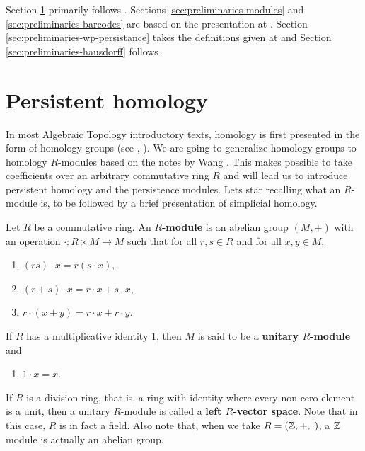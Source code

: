 Section \ref{sec:preliminaries-homology} primarily follows \cite{wang}. Sections \ref{sec:preliminaries-modules} and \ref{sec:preliminaries-barcodes} are based on the presentation at \cite{polterovich}. Section \ref{sec:preliminaries-wp-persistance} takes the definitions given at \cite{bubenik2} and Section \ref{sec:preliminaries-hausdorff} follows \cite{burago}.

\section{Persistent homology} \label{sec:preliminaries-homology}

In most Algebraic Topology introductory texts, homology is first presented in the form of homology groups (see \cite{munkres}, \cite{hatcher}). We are going to generalize homology groups to homology $R$-modules based on the notes by Wang \cite{wang}. This makes possible to take coefficients over an arbitrary commutative ring $ R $ and will lead us to introduce persistent homology and the persistence modules. Lets star recalling what an $R$-module is, to be followed by a brief presentation of simplicial homology.

\begin{definition}
    Let $ R $ be a commutative ring. An {\bf $R$-module } is an abelian group $ (M, +) $ with an operation $ \cdot \colon R \times M \to M $ such that for all $ r, s \in R $ and for all $ x, y \in M $,
    \begin{enumerate}
    \renewcommand{\labelenumi}{(\roman{enumi})}
        \item $ (rs) \cdot x = r (s \cdot x) $,
        \item $ (r + s) \cdot x = r \cdot x + s \cdot x $,
        \item $ r \cdot (x + y) = r \cdot x + r \cdot y $.
    \end{enumerate}
    If $ R $ has a multiplicative identity $ 1 $, then $ M $ is said to be a {\bf unitary $R$-module} and 
    \begin{enumerate}
    \renewcommand{\labelenumi}{(\roman{enumi})}
        \setcounter{enumi}{3}
        \item $1 \cdot x = x $.
    \end{enumerate}
    If $ R $ is a division ring, that is, a ring with identity where every non cero element is a unit, then 
    a unitary $R$-module is called a {\bf left $R$-vector space}. Note that in this case, $R$ is in fact a field. Also note that, when we take $ R = (\mathbb Z, +, \cdot) $, a $\mathbb Z$ module is actually an abelian group.
\end{definition}

